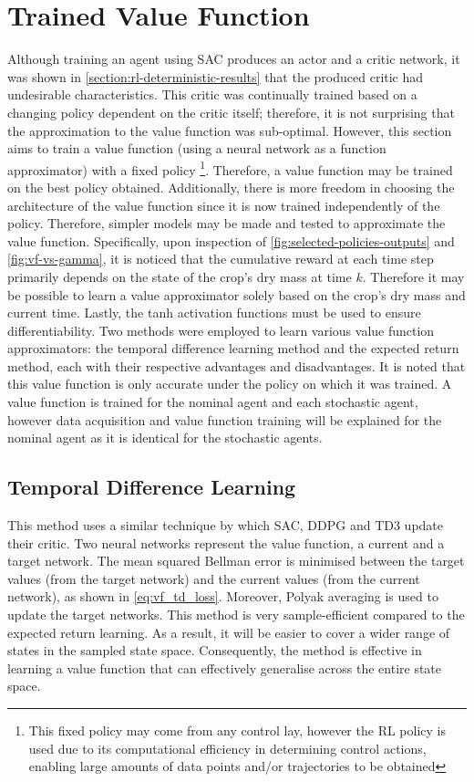 \section{Trained Value Function}
\label{section:trained-vf}
Although training an agent using SAC produces an actor and a critic network, it was shown in \autoref{section:rl-deterministic-results} that the produced critic had undesirable characteristics. This critic was continually trained based on a changing policy dependent on the critic itself; therefore, it is not surprising that the approximation to the value function was sub-optimal. However, this section aims to train a value function (using a neural network as a function approximator) with a fixed policy \footnote{This fixed policy may come from any control lay, however the RL policy is used due to its computational efficiency in determining control actions, enabling large amounts of data points and/or trajectories to be obtained}. Therefore, a value function may be trained on the best policy obtained. Additionally, there is more freedom in choosing the architecture of the value function since it is now trained independently of the policy. Therefore, simpler models may be made and tested to approximate the value function. Specifically, upon inspection of \autoref{fig:selected-policies-outputs} and \autoref{fig:vf-vs-gamma}, it is noticed that the cumulative reward at each time step primarily depends on the state of the crop’s dry mass at time $k$. Therefore it may be possible to learn a value approximator solely based on the crop’s dry mass and current time. Lastly, the tanh activation functions must be used to ensure differentiability. Two methods were employed to learn various value function approximators: the temporal difference learning method and the expected return method, each with their respective advantages and disadvantages. It is noted that this value function is only accurate under the policy on which it was trained. A value function is trained for the nominal agent and each stochastic agent, however data acquisition and value function training will be explained for the nominal agent as it is identical for the stochastic agents.


\subsection{Temporal Difference Learning}
\label{ssection:td-learning}

This method uses a similar technique by which SAC, DDPG and TD3 update their critic. Two neural networks represent the value function, a current and a target network. The mean squared Bellman error is minimised between the target values (from the target network) and the current values (from the current network), as shown in \autoref{eq:vf_td_loss}. Moreover, Polyak averaging is used to update the target networks. This method is very sample-efficient compared to the expected return learning. As a result, it will be easier to cover a wider range of states in the sampled state space. Consequently, the method is effective in learning a value function that can effectively generalise across the entire state space. 

